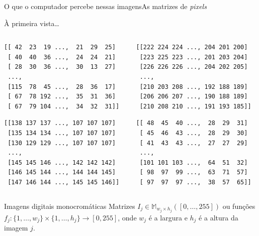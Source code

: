 \documentclass{beamer}
\begin{document}
    \begin{frame}[fragile]{O que o computador percebe nessas imagens}{As matrizes de \emph{pixels}}

        À primeira vista\ldots

        \begin{columns}
            \begin{column}{0.4\textwidth}
        {\tiny
        \begin{lstlisting}
[[ 42  23  19 ...,  21  29  25]
 [ 40  40  36 ...,  24  24  21]
 [ 28  30  36 ...,  30  13  27]
 ...,
 [115  78  45 ...,  28  36  17]
 [ 67  78 192 ...,  35  31  36]
 [ 67  79 104 ...,  34  32  31]]
        \end{lstlisting}}

        {\tiny
        \begin{lstlisting}
[[138 137 137 ..., 107 107 107]
 [135 134 134 ..., 107 107 107]
 [130 129 129 ..., 107 107 107]
 ..., 
 [145 145 146 ..., 142 142 142]
 [146 145 144 ..., 144 144 145]
 [147 146 144 ..., 145 145 146]]
        \end{lstlisting}}
            \end{column}
            \begin{column}{0.5\textwidth}

        {\tiny
        \begin{lstlisting}
[[222 224 224 ..., 204 201 200]
 [223 225 223 ..., 201 203 204]
 [226 226 226 ..., 204 202 205]
 ..., 
 [210 203 208 ..., 192 188 189]
 [206 206 207 ..., 190 188 189]
 [210 208 210 ..., 191 193 185]]
        \end{lstlisting}}

        {\tiny
        \begin{lstlisting}
[[ 48  45  40 ...,  28  29  31]
 [ 45  46  43 ...,  28  29  30]
 [ 41  43  43 ...,  27  27  29]
 ..., 
 [101 101 103 ...,  64  51  32]
 [ 98  97  99 ...,  63  71  57]
 [ 97  97  97 ...,  38  57  65]]
        \end{lstlisting}}

            \end{column}
        \end{columns}

        \pause

        \begin{block}{Imagens digitais monocromáticas}
            Matrizes $I_j \in \mathbb{M}_{w_j \times h_j}([0,\ldots,255])$
 ou funções $f_j:\{1,\ldots,w_j\} \times \{1,\ldots,h_j\} 
 \to [0,255]$, onde $w_j$ é a largura e $h_j$ é a altura da imagem $j$.
        \end{block}

    \end{frame}
    
\end{document}
